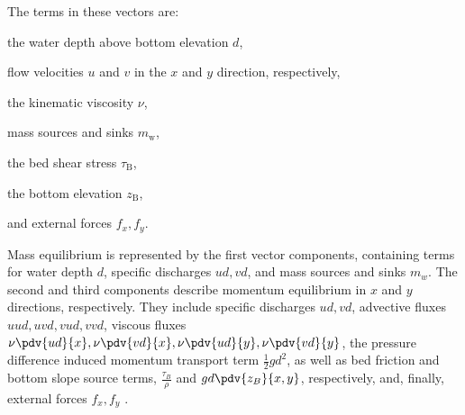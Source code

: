 The terms in these vectors are:
\begin{enumerate*}[label=(\roman*)]
	\item the water depth above bottom elevation $d$,
    \item flow velocities $u$ and $v$ in the $x$ and $y$ direction, respectively,
	\item the kinematic viscosity $\nu$, %
	\item mass sources and sinks $m_{\mathrm{w}}$,
	\item the bed shear stress $\tau_{\mathrm{B}}$,
	\item the bottom elevation $z_{\mathrm{B}}$,
	\item and external forces $f_{x}, f_{y}$. %
\end{enumerate*}

\label{fix:vector-components}
Mass equilibrium is represented by the first vector components, containing terms for water depth $d$, specific discharges $ud, vd$, and mass sources and sinks $m_w$.
The second and third components describe momentum equilibrium in $x$ and $y$ directions, respectively. 
They include specific discharges $ud, vd$, 
advective fluxes $uud, uvd, vud, vvd$,
viscous fluxes $\nu \pdv{ud}{x}, \nu \pdv{vd}{x}, \nu \pdv{ud}{y}, \nu \pdv{vd}{y}$,
the pressure difference induced momentum transport term $\frac{1}{2}gd^{2}$,
as well as bed friction and bottom slope source terms, $\frac{\tau_B}{\rho}$ and $gd \pdv{z_{B}}{x, y}$, respectively,
and, finally, external forces $f_x, f_y$ \autocite{simons2020}.


